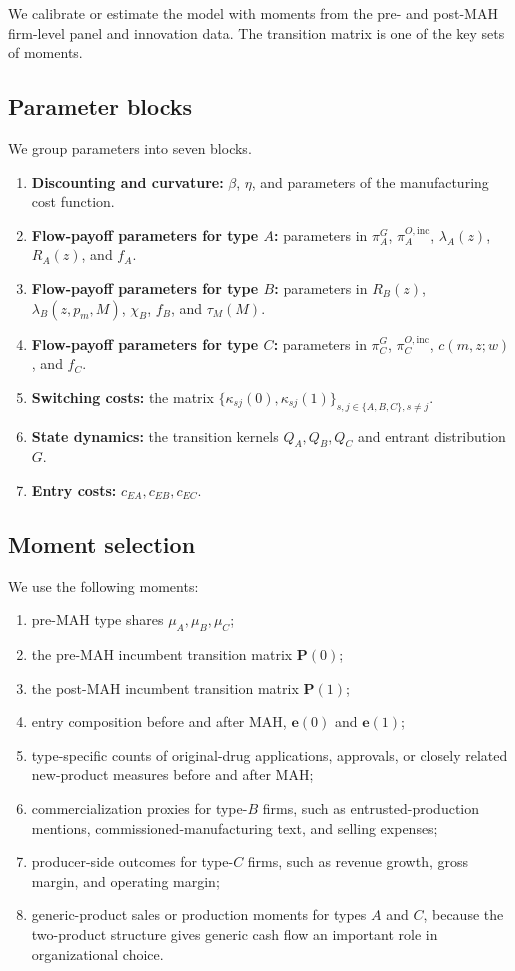 \documentclass[12pt]{article}
\newcommand{\1}{\mathbf{1}}
\begin{document}
We calibrate or estimate the model with moments from the pre- and post-MAH firm-level panel and innovation data. The transition matrix is one of the key sets of moments.

\subsection{Parameter blocks}

We group parameters into seven blocks.
\begin{enumerate}[leftmargin=2em]
    \item \textbf{Discounting and curvature:} $\beta$, $\eta$, and parameters of the manufacturing cost function.
    \item \textbf{Flow-payoff parameters for type $A$:} parameters in $\pi_A^G$, $\pi_A^{O,\mathrm{inc}}$, $\lambda_A(z)$, $R_A(z)$, and $f_A$.
    \item \textbf{Flow-payoff parameters for type $B$:} parameters in $R_B(z)$, $\lambda_B(z,p_m,M)$, $\chi_B$, $f_B$, and $\tau_M(M)$.
    \item \textbf{Flow-payoff parameters for type $C$:} parameters in $\pi_C^G$, $\pi_C^{O,\mathrm{inc}}$, $c(m,z;w)$, and $f_C$.
    \item \textbf{Switching costs:} the matrix $\{\kappa_{sj}(0),\kappa_{sj}(1)\}_{s,j\in\{A,B,C\},s\neq j}$.
    \item \textbf{State dynamics:} the transition kernels $Q_A,Q_B,Q_C$ and entrant distribution $G$.
    \item \textbf{Entry costs:} $c_{EA},c_{EB},c_{EC}$.
\end{enumerate}

\subsection{Moment selection}

We use the following moments:
\begin{enumerate}[leftmargin=2em]
    \item pre-MAH type shares $\mu_A,\mu_B,\mu_C$;
    \item the pre-MAH incumbent transition matrix $\mathbf P(0)$;
    \item the post-MAH incumbent transition matrix $\mathbf P(1)$;
    \item entry composition before and after MAH, $\mathbf e(0)$ and $\mathbf e(1)$;
    \item type-specific counts of original-drug applications, approvals, or closely related new-product measures before and after MAH;
    \item commercialization proxies for type-$B$ firms, such as entrusted-production mentions, commissioned-manufacturing text, and selling expenses;
    \item producer-side outcomes for type-$C$ firms, such as revenue growth, gross margin, and operating margin;
    \item generic-product sales or production moments for types $A$ and $C$, because the two-product structure gives generic cash flow an important role in organizational choice.
\end{enumerate}
\end{document}
